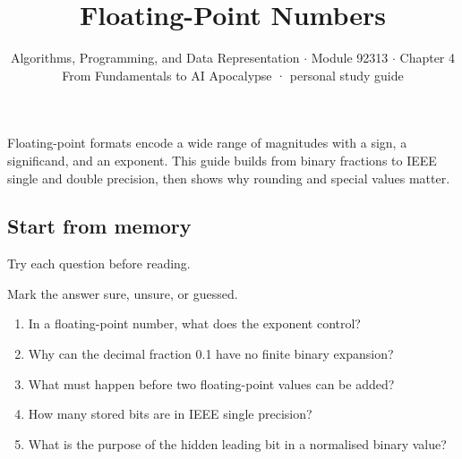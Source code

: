 \documentclass[11pt]{article}
\title{\sffamily\bfseries\color{FAUblue}Floating-Point Numbers}
\author{Algorithms, Programming, and Data Representation \ensuremath{\cdot} Module 92313 \ensuremath{\cdot} Chapter 4\\[2pt]\small From Fundamentals to AI Apocalypse · personal study guide}
\date{}
\begin{document}
\maketitle
\begingroup\footnotesize\setlength{\parskip}{0pt}\tableofcontents\endgroup
\clearpage

{\large Floating-point formats encode a wide range of magnitudes with a sign, a significand, and an exponent. This guide builds from binary fractions to IEEE single and double precision, then shows why rounding and special values matter.}


\begin{keepsection}
\section{Start from memory}

Try each question before reading.

Mark the answer sure, unsure, or guessed.

\begin{enumerate}
\item In a floating-point number, what does the exponent control?
\item Why can the decimal fraction 0.1 have no finite binary expansion?
\item What must happen before two floating-point values can be added?
\item How many stored bits are in IEEE single precision?
\item What is the purpose of the hidden leading bit in a normalised binary value?
\end{enumerate}

\end{keepsection}
\end{document}
